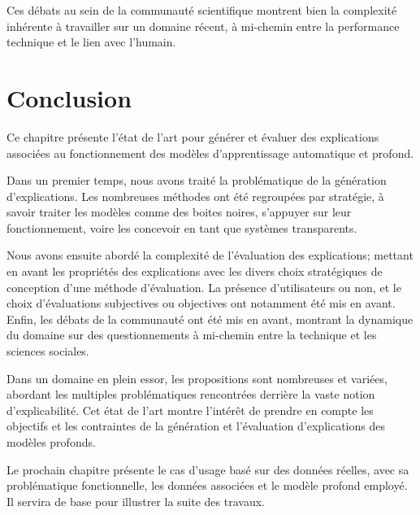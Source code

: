 Ces débats au sein de la communauté scientifique montrent bien la complexité inhérente à travailler sur un domaine récent, à mi-chemin entre la performance technique et le lien avec l'humain.

\section{Conclusion}

Ce chapitre présente l'état de l'art pour générer et évaluer des explications associées au fonctionnement des modèles d'apprentissage automatique et profond.

Dans un premier temps, nous avons traité la problématique de la génération d'explications. Les nombreuses méthodes ont été regroupées par stratégie, à savoir traiter les modèles comme des boites noires, s'appuyer sur leur fonctionnement, voire les concevoir en tant que systèmes transparents.

Nous avons ensuite abordé la complexité de l'évaluation des explications; mettant en avant les propriétés des explications avec les divers choix stratégiques de conception d'une méthode d'évaluation. La présence d'utilisateurs ou non, et le choix d'évaluations subjectives ou objectives ont notamment été mis en avant.
Enfin, les débats de la communauté ont été mis en avant, montrant la dynamique du domaine sur des questionnements à mi-chemin entre la technique et les sciences sociales.

Dans un domaine en plein essor, les propositions sont nombreuses et variées, abordant les multiples problématiques rencontrées derrière la vaste notion d'explicabilité.
Cet état de l'art montre l'intérêt de prendre en compte les objectifs et les contraintes de la génération et l'évaluation d'explications des modèles profonds.

Le prochain chapitre présente le cas d'usage basé sur des données réelles, avec sa problématique fonctionnelle, les données associées et le modèle profond employé. Il servira de base pour illustrer la suite des travaux.

